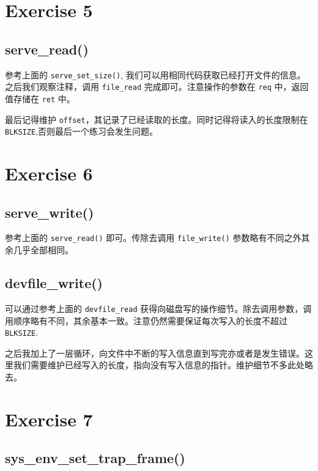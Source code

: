 \documentclass[11pt]{article}
\begin{document}
	\section{Exercise 5}
	
	\subsection*{serve\_read()}
	
	\par 参考上面的 \texttt{serve\_set\_size()}, 我们可以用相同代码获取已经打开文件的信息。之后我们观察注释，调用 \texttt{file\_read} 完成即可。注意操作的参数在 \texttt{req} 中，返回值存储在 \texttt{ret} 中。
	
	\par 最后记得维护 \texttt{offset}，其记录了已经读取的长度。同时记得将读入的长度限制在 \texttt{BLKSIZE},否则最后一个练习会发生问题。
	
	\section{Exercise 6}
	
	\subsection*{serve\_write()}
	
	\par 参考上面的 \texttt{serve\_read()} 即可。传除去调用 \texttt{file\_write()} 参数略有不同之外其余几乎全部相同。
	
	
	\subsection*{devfile\_write()}
	
	\par 可以通过参考上面的 \texttt{devfile\_read} 获得向磁盘写的操作细节。除去调用参数，调用顺序略有不同，其余基本一致。注意仍然需要保证每次写入的长度不超过 \texttt{BLKSIZE}.
	
	\par 之后我加上了一层循环，向文件中不断的写入信息直到写完亦或者是发生错误。这里我们需要维护已经写入的长度，指向没有写入信息的指针。维护细节不多此处略去。
	

	\section{Exercise 7}
	
	\subsection*{sys\_env\_set\_trap\_frame()}
		
\end{document}
